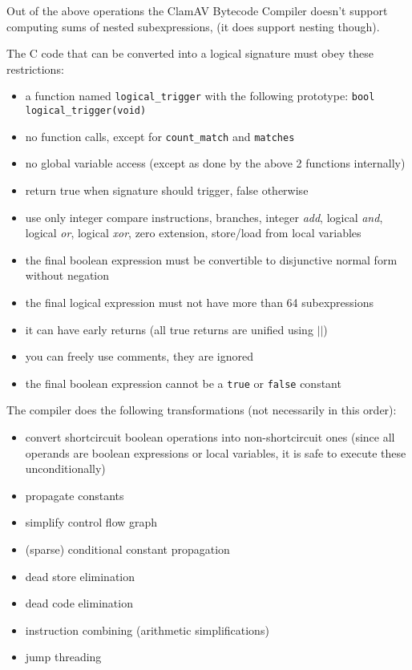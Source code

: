 Out of the above operations the ClamAV Bytecode Compiler doesn't support computing sums of nested subexpressions,
(it does support nesting though).

The C code that can be converted into a logical signature must obey these restrictions:
\begin{itemize}
 \item a function named \verb+logical_trigger+ with the following prototype:
\verb+bool logical_trigger(void)+
 \item no function calls, except for \verb+count_match+ and \verb+matches+
 \item no global variable access (except as done by the above 2 functions internally)
 \item return true when signature should trigger, false otherwise
 \item use only integer compare instructions, branches, integer \emph{add}, logical \emph{and}, logical \emph{or},
logical \emph{xor}, zero extension, store/load from local variables
 \item the final boolean expression must be convertible to disjunctive normal form without negation
 \item the final logical expression must not have more than 64 subexpressions
 \item it can have early returns (all true returns are unified using $||$)
 \item you can freely use comments, they are ignored
 \item the final boolean expression cannot be a \verb+true+ or \verb+false+ constant
\end{itemize}

The compiler does the following transformations (not necessarily in this order):
\begin{itemize}
 \item convert shortcircuit boolean operations into non-shortcircuit ones (since all operands are boolean expressions or local variables,
it is safe to execute these unconditionally)
 \item propagate constants
 \item simplify control flow graph
 \item (sparse) conditional constant propagation
 \item dead store elimination
 \item dead code elimination
 \item instruction combining (arithmetic simplifications)
 \item jump threading
\end{itemize}

